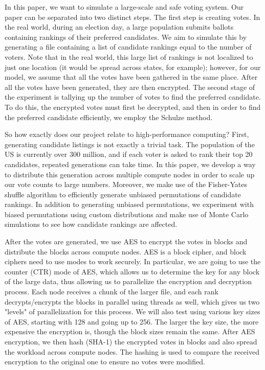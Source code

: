 \documentclass[final,5p,times,twocolumn,authoryear, 10pt]{elsarticle}
\begin{document}
In this paper, we want to simulate a large-scale and safe voting system. Our
paper can be separated into two distinct steps. The first step is creating
votes. In the real world, during an election day, a large population submits
ballots containing rankings of their preferred candidates. We aim to simulate
this by generating a file containing a list of candidate rankings equal to the
number of voters. Note that in the real world, this large list of rankings is
not localized to just one location (it would be spread across states, for
example); however, for our model, we assume that all the votes have been
gathered in the same place. After all the votes have been generated, they are
then encrypted. The second stage of the experiment is tallying up the number of
votes to find the preferred candidate. To do this, the encrypted votes must
first be decrypted, and then in order to find the preferred candidate
efficiently, we employ the Schulze method.

So how exactly does our project relate to high-performance computing? First,
generating candidate listings is not exactly a trivial task. The population of
the US is currently over 300 million, and if each voter is asked to rank their
top 20 candidates, repeated generations can take time. In this paper, we
develop a way to distribute this generation across multiple compute nodes in
order to scale up our vote counts to large numbers. Moreover, we make use of
the Fisher-Yates shuffle algorithm to efficiently generate unbiased
permutations of candidate rankings. In addition to generating unbiased
permutations, we experiment with biased permutations using custom distributions
and make use of Monte Carlo simulations to see how candidate rankings are
affected. 

After the votes are generated, we use AES to encrypt the votes in blocks and
distribute the blocks across compute nodes. AES is a block cipher, and block
ciphers need to use modes to work securely. In particular, we are going to use
the counter (CTR) mode of AES, which allows us to determine the key for any
block of the large data, thus allowing us to parallelize the encryption and
decryption process. Each node receives a chunk of the larger file, and each
rank decrypts/encrypts the blocks in parallel using threads as well, which
gives us two "levels" of parallelization for this process. We will also test
using various key sizes of AES, starting with 128 and going up to 256. The
larger the key size, the more expensive the encryption is, though the block
sizes remain the same. After AES encryption, we then hash (SHA-1) the encrypted
votes in blocks and also spread the workload across compute nodes. The hashing
is used to compare the received encryption to the original one to ensure no
votes were modified.
\end{document}
